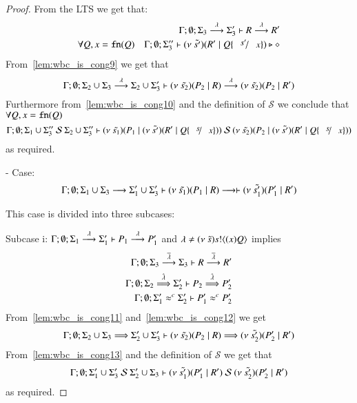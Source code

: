 \begin{proof}
	\noi From the LTS we get that:
	\begin{eqnarray}
		& &	\Gamma; \emptyset; \Sigma_3 \by{\lambda} \Sigma_3' \proves R \by{\lambda} R' \label{lem:wbc_is_cong9}\\
		\forall Q, x = \fn{Q} & & \Gamma; \emptyset; \Sigma_3'' \proves \newsp{\tilde{s'}}{R' \Par Q \subst{s'}{x}} \hastype \Proc \label{lem:wbc_is_cong10}
	\end{eqnarray}
%
	\noi From~\ref{lem:wbc_is_cong9} we get that
	\[
		\Gamma; \emptyset; \Sigma_2 \cup \Sigma_3 \stackrel{\lambda}{\longrightarrow} \Sigma_2 \cup \Sigma_3' \vdash (\nu\ \tilde{s_2})(P_2 \;|\; R) \stackrel{\lambda}{\longrightarrow} (\nu\ \tilde{s_2})(P_2 \;|\; R')
	\]
	\noi Furthermore from~\ref{lem:wbc_is_cong10} and the definition of $\mathcal{S}$ we conclude that
	$\forall Q, x = \mathtt{fn}(Q)$
	\[
		\Gamma; \emptyset; \Sigma_1 \cup \Sigma_3''\ \mathcal{S}\ \Sigma_2 \cup \Sigma_3'' \proves \newsp{\tilde{s_1}}{P_1 \Par \newsp{\tilde{s'}}{R' \Par Q \subst{s}{x}}}\ \mathcal{S}\ \newsp{\tilde{s_2}}{P_2 \Par \newsp{\tilde{s'}}{R' \Par Q \subst{s}{x}}}
	\]
	\noi as required.



	\noi - Case:
	\[
		\Gamma; \emptyset; \Sigma_1 \cup \Sigma_3 \stackrel{}{\longrightarrow} \Sigma_1' \cup \Sigma_3' \vdash (\nu\ \tilde{s_1})(P_1 \;|\; R) \stackrel{}{\longrightarrow} \vdash (\nu\ \tilde{s_1'})(P_1' \;|\; R')
	\]

	\noi This case is divided into three subcases:

	\noi Subcase i: $\Gamma; \emptyset; \Sigma_1 \stackrel{\lambda}{\longrightarrow} \Sigma_1' \vdash P_1 \stackrel{\lambda}{\longrightarrow} P_1'$
	and $\lambda \not= (\nu\ \tilde{s}) s ! \langle (x)Q \rangle$ implies
%
	\begin{eqnarray}
		\Gamma; \emptyset; \Sigma_3 \stackrel{\overline{\lambda}}{\longrightarrow} \Sigma_3 \vdash R \stackrel{\overline{\lambda}}{\longrightarrow} R' \label{lem:wbc_is_cong11} \\
		\Gamma; \emptyset; \Sigma_2 \stackrel{\hat{\lambda}}{\Longrightarrow} \Sigma_2' \vdash P_2 \stackrel{\hat{\lambda}}{\Longrightarrow} P_2' \label{lem:wbc_is_cong12}\\
		\Gamma; \emptyset; \Sigma_1' \approx^{c} \Sigma_2' \vdash P_1' \approx^{c} P_2' \label{lem:wbc_is_cong13}
	\end{eqnarray}
%
	\noi From~\ref{lem:wbc_is_cong11} and~\ref{lem:wbc_is_cong12} we get
	\[
		\Gamma; \emptyset; \Sigma_2 \cup \Sigma_3 \stackrel{}{\Longrightarrow} \Sigma_2' \cup \Sigma_3' \vdash (\nu\ \tilde{s_2})(P_2 \;|\; R) \stackrel{}{\Longrightarrow} (\nu\ \tilde{s_2'})(P_2' \;|\; R')
	\]
%
	\noi From~\ref{lem:wbc_is_cong13} and the definition of $\mathcal{S}$ we get that
	\[
		\Gamma; \emptyset; \Sigma_1' \cup \Sigma_3'\ \mathcal{S}\ \Sigma_2' \cup \Sigma_3 \proves \newsp{\tilde{s_1'}}{P_1' \Par R'}\ \mathcal{S}\ \newsp{\tilde{s_2'}}{P_2' \Par R'}
	\]
	\noi as required.


\end{proof}

